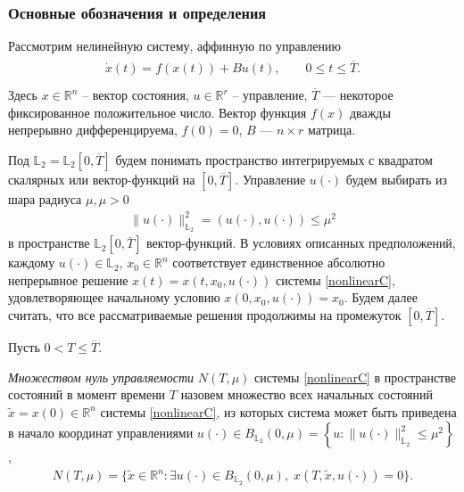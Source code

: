 \documentclass[../main.tex]{subfiles}
\begin{document}
	\subsubsection{Основные обозначения и определения}
	Рассмотрим нелинейную систему, аффинную по управлению
	\begin{gather}\label{nonlinearC}
		\begin{gathered}
			\dot{x}(t)=f(x(t))+B u(t), \qquad 0 \leqslant t \leqslant   \overline{T}. \\
		\end{gathered}
	\end{gather}
	Здесь $ x \in \mathbb{R}^n $ -- вектор состояния, $ u \in \mathbb{R}^r $ -- управление,  $ \overline{
	T} $ --- некоторое фиксированное положительное число. Вектор функция $f(x)$ дважды непрерывно дифференцируема, $f(0)=0$, $B$ --- $n \times r$ матрица.
	
	
	Под $ \mathbb{L}_2 = \mathbb{L}_2[0,\overline{T}]  $ будем понимать  пространство интегрируемых с квадратом скалярных или вектор-функций  на $ [0,\overline{T}] $. 
	 Управление $ u(\cdot) $ будем выбирать из шара радиуса $ \mu, \mu > 0 $
	\begin{gather}\label{constrC}
		\lVert u(\cdot)\rVert^2_{\mathbb{L}_2} = \left(u(\cdot),u(\cdot) \right) \leqslant \mu^2
	\end{gather}
	в пространстве $\mathbb{L}_2[0,\overline{T}]$ вектор-функций.
	В условиях описанных предположений, каждому $ u(\cdot) \in \mathbb{L}_2 $, $x_0 \in  \mathbb{R}^n  $ соответствует единственное абсолютно непрерывное решение $ x(t)=x(t,x_0, u(\cdot)) $ системы \eqref{nonlinearC}, удовлетворяющее начальному условию  $ x(0,x_0, u(\cdot)) = x_0$. Будем далее считать, что все рассматриваемые решения продолжимы  на промежуток $[0,\overline{T}]$.  
	
	
	
	Пусть $ 0 <  T \leqslant \overline{T} $.
	\begin{definition}
		{\it Множеством нуль управляемости} $ N(T,\mu) $ системы \eqref{nonlinearC}  в  пространстве состояний в момент времени $ T $ назовем
		множество всех начальных состояний $ \widetilde{x}=x(0) \in \mathbb{R}^n $ системы \eqref{nonlinearC},  из которых система может быть приведена в начало координат управлениями
		$ u(\cdot) \in B_{\mathbb{L}_2}(0,\mu)  =\left\lbrace u:\lVert u(\cdot)\rVert^2_{\mathbb{L}_2} \leqslant \mu^2\right\rbrace  $,
		\begin{gather*}
			N(T,\mu)=\{\widetilde{x}\in \mathbb{R}^n:\exists u(\cdot)\in B_{\mathbb{L}_2}(0,\mu),\; x( T,\widetilde{x},u(\cdot)) = 0\}.
		\end{gather*}
	\end{definition}
	
\end{document}
